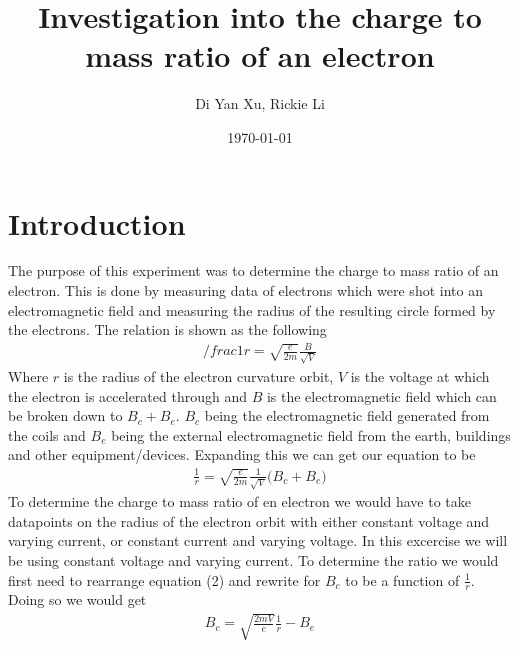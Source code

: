 \documentclass{article}
\title{Investigation into the charge to mass ratio of an electron}
\author{Di Yan Xu, Rickie Li}
\date{\today}
\begin{document}
\maketitle

\newpage

\section{Introduction}
The purpose of this experiment was to determine the charge to mass ratio of an
electron. This is done by measuring data of electrons which were shot into
an electromagnetic field and measuring the radius of the resulting circle
formed by the electrons. The relation is shown as the following
\begin{align}
    /frac{1}{r} = \sqrt{\frac{e}{2m}}\frac{B}{\sqrt{V}}
\end{align}
Where $r$ is the radius of the electron curvature orbit, $V$ is the voltage at
which the electron is accelerated through and $B$ is the electromagnetic field
which can be broken down to $B_c + B_e$.
$B_c$ being the electromagnetic field generated from the coils and $B_e$ being
the external electromagnetic field from the earth, buildings and other 
equipment/devices. Expanding this we can get our equation to be
\begin{align}
    \frac{1}{r} = \sqrt{\frac{e}{2m}} \frac{1}{\sqrt{V}}\big(B_c + B_e\big)
\end{align}
To determine the charge to mass ratio of en electron we would have to take
datapoints on the radius of the electron orbit with either constant voltage and
varying current, or constant current and varying voltage. In this excercise we
will be using constant voltage and varying current. To determine the ratio we
would first need to rearrange equation (2) and rewrite for $B_c$ to be a function
of $\frac{1}{r}$. Doing so we would get
\begin{align}
    B_c = \sqrt{\frac{2mV}{e}}\frac{1}{r} - B_e
\end{align}
\end{document}

